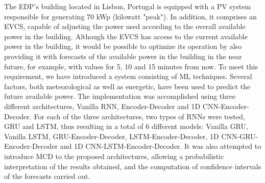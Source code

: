 \noindent The \ac{EDP}'s building located in Lisbon, Portugal is equipped with a \ac{PV} system responsible for generating 70 kWp (kilowatt "peak"). In addition, it comprises an \ac{EVCS}, capable of adjusting the power used according to the overall available power in the building. Although the \ac{EVCS} has access to the current available power in the building, it would be possible to optimize its operation by also providing it with forecasts of the available power in the building in the near future, for example, with values for 5, 10 and 15 minutes from now. To meet this requirement, we have introduced a system consisting of \ac{ML} techniques. Several factors, both meteorological as well as energetic, have been used to predict the future available power. The implementation was accomplished using three different architectures, Vanilla \ac{RNN}, Encoder-Decoder and \ac{1D CNN}-Encoder-Decoder. For each of the three architectures, two types of \ac{RNN}s were tested, \ac{GRU} and \ac{LSTM}, thus resulting in a total of 6 different models: Vanilla \ac{GRU}, Vanilla \ac{LSTM}, \ac{GRU}-Encoder-Decoder, \ac{LSTM}-Encoder-Decoder, \ac{1D CNN}-\ac{GRU}-Encoder-Decoder and \ac{1D CNN}-\ac{LSTM}-Encoder-Decoder. It was also attempted to introduce \ac{MCD} to the proposed architectures, allowing a probabilistic interpretation of the results obtained, and the computation of confidence intervals of the forecasts carried out. 
